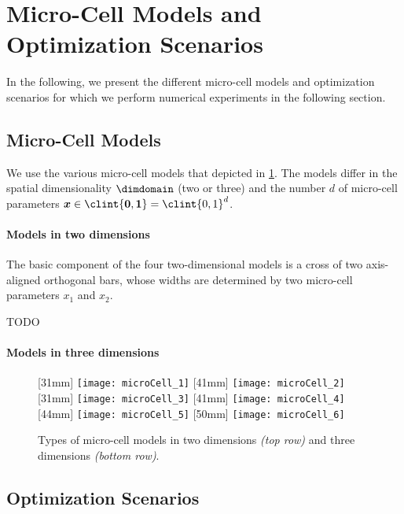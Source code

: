 \section{Micro-Cell Models and Optimization Scenarios}
\label{sec:63models}


\noindent
In the following, we present the different micro-cell models
and optimization scenarios for which we perform numerical
experiments in the following section.



\subsection{Micro-Cell Models}
\label{sec:631models}

We use the various micro-cell models that depicted in \cref{fig:microCell}.
The models differ in the spatial dimensionality $\dimdomain$ (two or three)
and the number $d$ of micro-cell parameters
$\*x \in \clint{\*0, \*1} = \clint{0, 1}^d$.

\paragraph{Models in two dimensions}

The basic component of the four two-dimensional models
is a cross of two axis-aligned orthogonal bars, whose widths
are determined by two micro-cell parameters $x_1$ and $x_2$.

TODO

\paragraph{Models in three dimensions}

\dummytext[3]{}

\begin{figure}
  [31mm]{%
    \texttt{[image: microCell\_1]}%
  }%
  \hfill%
  [41mm]{%
    \texttt{[image: microCell\_2]}%
  }%
  \hfill%
  [31mm]{%
    \texttt{[image: microCell\_3]}%
  }%
  \hfill%
  [41mm]{%
    \texttt{[image: microCell\_4]}%
  }\\[2mm]%
  [44mm]{%
    \texttt{[image: microCell\_5]}%
  }%
  \qquad%
  [50mm]{%
    \texttt{[image: microCell\_6]}%
  }%
  \caption[Types of micro-cell models]{%
    Types of micro-cell models in two dimensions \emph{(top row)}
    and three dimensions \emph{(bottom row)}.%
  }%
  \label{fig:microCell}%
\end{figure}

\subsection{Optimization Scenarios}
\label{sec:632scenarios}

\dummytext[5]{}
